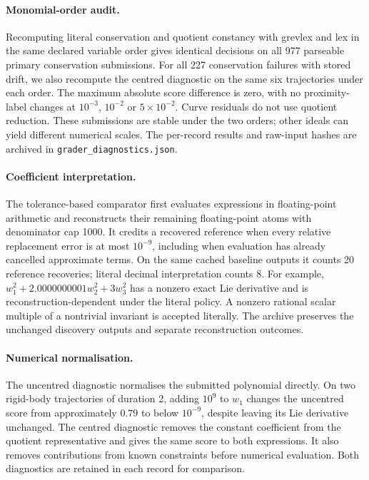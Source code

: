 \documentclass[10pt]{article}
\begin{document}
\paragraph{Monomial-order audit.} Recomputing literal conservation and quotient constancy with grevlex and lex in the same declared variable order gives identical decisions on all 977 parseable primary conservation submissions. For all 227 conservation failures with stored drift, we also recompute the centred diagnostic on the same six trajectories under each order. The maximum absolute score difference is zero, with no proximity-label changes at $10^{-3}$, $10^{-2}$ or $5\times10^{-2}$. Curve residuals do not use quotient reduction. These submissions are stable under the two orders; other ideals can yield different numerical scales. The per-record results and raw-input hashes are archived in \texttt{grader\_diagnostics.json}.

\paragraph{Coefficient interpretation.} The tolerance-based comparator first evaluates expressions in floating-point arithmetic and reconstructs their remaining floating-point atoms with denominator cap 1000. It credits a recovered reference when every relative replacement error is at most $10^{-9}$, including when evaluation has already cancelled approximate terms. On the same cached baseline outputs it counts 20 reference recoveries; literal decimal interpretation counts 8. For example, $w_1^2+2.0000000001w_2^2+3w_3^2$ has a nonzero exact Lie derivative and is reconstruction-dependent under the literal policy. A nonzero rational scalar multiple of a nontrivial invariant is accepted literally. The archive preserves the unchanged discovery outputs and separate reconstruction outcomes.

\paragraph{Numerical normalisation.} The uncentred diagnostic normalises the submitted polynomial directly. On two rigid-body trajectories of duration 2, adding $10^9$ to $w_1$ changes the uncentred score from approximately $0.79$ to below $10^{-9}$, despite leaving its Lie derivative unchanged. The centred diagnostic removes the constant coefficient from the quotient representative and gives the same score to both expressions. It also removes contributions from known constraints before numerical evaluation. Both diagnostics are retained in each record for comparison.
\end{document}
